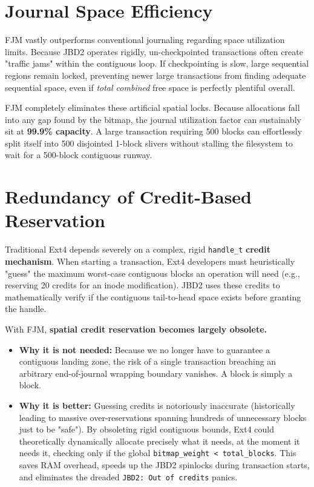 \documentclass{article}
\begin{document}
\section{Journal Space Efficiency}
FJM vastly outperforms conventional journaling regarding space utilization limits.
Because JBD2 operates rigidly, un-checkpointed transactions often create "traffic jams" within the contiguous loop. If checkpointing is slow, large sequential regions remain locked, preventing newer large transactions from finding adequate sequential space, even if \textit{total combined} free space is perfectly plentiful overall. 

FJM completely eliminates these artificial spatial locks. Because allocations fall into any gap found by the bitmap, the journal utilization factor can sustainably sit at \textbf{99.9\% capacity}. A large transaction requiring 500 blocks can effortlessly split itself into 500 disjointed 1-block slivers without stalling the filesystem to wait for a 500-block contiguous runway.



\section{Redundancy of Credit-Based Reservation}
Traditional Ext4 depends severely on a complex, rigid \texttt{handle\_t} \textbf{credit mechanism}. When starting a transaction, Ext4 developers must heuristically "guess" the maximum worst-case contiguous blocks an operation will need (e.g., reserving 20 credits for an inode modification). JBD2 uses these credits to mathematically verify if the contiguous tail-to-head space exists before granting the handle. 

With FJM, \textbf{spatial credit reservation becomes largely obsolete.} 
\begin{itemize}
    \item \textbf{Why it is not needed:} Because we no longer have to guarantee a contiguous landing zone, the risk of a single transaction breaching an arbitrary end-of-journal wrapping boundary vanishes. A block is simply a block.
    \item \textbf{Why it is better:} Guessing credits is notoriously inaccurate (historically leading to massive over-reservations spanning hundreds of unnecessary blocks just to be "safe"). By obsoleting rigid contiguous bounds, Ext4 could theoretically dynamically allocate precisely what it needs, at the moment it needs it, checking only if the global \texttt{bitmap\_weight < total\_blocks}. This saves RAM overhead, speeds up the JBD2 spinlocks during transaction starts, and eliminates the dreaded \texttt{JBD2: Out of credits} panics.
\end{itemize}
\end{document}
